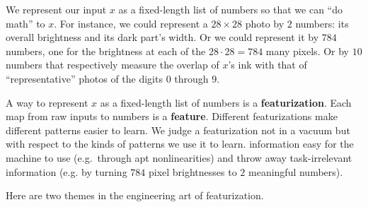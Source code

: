   We represent our input $x$ as a fixed-length list of numbers so that we can
  ``do math'' to $x$.  For instance, we could represent a $28\times 28$ photo
  by $2$ numbers: its overall brightness and its dark part's width.  Or we
  could represent it by $784$ numbers, one for the brightness at each of the
  $28\cdot 28=784$ many pixels.  Or by $10$ numbers that respectively measure
  the overlap of $x$'s ink with that of ``representative'' photos of the digits
  $0$ through $9$.

  A way to represent $x$ as a fixed-length list of numbers is a
  \textbf{featurization}.  Each map from raw inputs to numbers is
  a \textbf{feature}.
  Different featurizations make different
  patterns easier to learn.
  We judge a featurization not in a vacuum but with respect to the kinds of
  patterns we use it to learn. %
  information easy for the machine to use (e.g.\ through apt nonlinearities)
  and throw away task-irrelevant information (e.g. by turning $784$ pixel
  brightnesses to $2$ meaningful numbers).

  Here are two themes in the engineering art of featurization.

